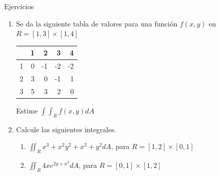 \begin{frame}{Ejercicios}
  \vspace{-5mm}
  \begin{enumerate}
    \item Se da la siguiente tabla de valores para una función $f(x,y)$ en $R=[1,3]\times[1,4]$
      \begin{center}
      \begin{tabular}{|c||r|r|r|r|}
      \hline
          & 1 &  2 &  3 &  4 \\
      \hline
      \hline
      1   & 0 & -1 & -2 & -2 \\
      \hline
      2   & 3 &  0 & -1 &  1 \\
      \hline
      3   & 5 &  3 &  2 &  0 \\
      \hline
      \end{tabular}
      \end{center}
    Estime $\int\!\!\!\int_R f(x,y)dA$
    \vspace{3mm}
    \item Calcule las siguientes integrales.
      \begin{enumerate}
        \item $\displaystyle\iint_{R} x^3+x^2y^2+x^2+y^2 dA$, para $R=[1,2]\times[0,1]$
        \item $\displaystyle\iint_{R} 4xe^{2y+x^2} dA$, para $R=[0,1]\times[1,2] $
      \end{enumerate}
  \end{enumerate}
\end{frame}

